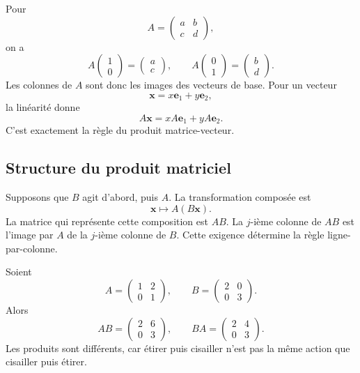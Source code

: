 \documentclass[12pt,a4paper,openany]{book}
\begin{document}
Pour
\[
A=
\begin{pmatrix}
a&b\\c&d
\end{pmatrix},
\]
on a
\[
A\begin{pmatrix}1\\0\end{pmatrix}
=
\begin{pmatrix}a\\c\end{pmatrix},
\qquad
A\begin{pmatrix}0\\1\end{pmatrix}
=
\begin{pmatrix}b\\d\end{pmatrix}.
\]
Les colonnes de $A$ sont donc les images des vecteurs de base. Pour un vecteur
\[
\mathbf x=x\mathbf e_1+y\mathbf e_2,
\]
la linéarité donne
\[
A\mathbf x=xA\mathbf e_1+yA\mathbf e_2.
\]
C'est exactement la règle du produit matrice-vecteur.

\subsection{Structure du produit matriciel}

Supposons que $B$ agit d'abord, puis $A$. La transformation composée est
\[
\mathbf x\longmapsto A(B\mathbf x).
\]
La matrice qui représente cette composition est $AB$. La $j$-ième colonne de $AB$ est l'image par $A$ de la $j$-ième colonne de $B$. Cette exigence détermine la règle ligne-par-colonne.

\begin{examplebox}
Soient
\[
A=\begin{pmatrix}1&2\\0&1\end{pmatrix},
\qquad
B=\begin{pmatrix}2&0\\0&3\end{pmatrix}.
\]
Alors
\[
AB=\begin{pmatrix}2&6\\0&3\end{pmatrix},
\qquad
BA=\begin{pmatrix}2&4\\0&3\end{pmatrix}.
\]
Les produits sont différents, car étirer puis cisailler n'est pas la même action que cisailler puis étirer.
\end{examplebox}
\end{document}
